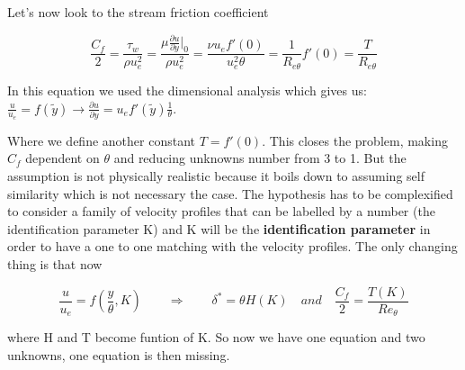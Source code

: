 Let's now look to the stream friction coefficient

\begin{equation}
\frac{C_f}{2}=\frac{\tau_w}{\rho u_e^2}=\frac{\mu \frac{\partial u}{\partial y}|_0}{\rho u_e^2}=\frac{\nu u_e f'(0)}{u_e^2 \theta}=\frac{1}{R_{e \theta}} f'(0)=\frac{T}{R_{e \theta}}
\end{equation}

In this equation we used the dimensional analysis which gives us:
$\frac{u}{u_e}=f(\tilde{y}) \rightarrow \frac{\partial u}{\partial y}=u_e f'(\tilde{y}) \frac{1}{\theta}$.

Where we define another constant $T=f'(0)$. This closes the problem, making $C_f$ dependent on $\theta$ and reducing unknowns number from 3 to 1. But the assumption is not physically realistic because it boils down to assuming self similarity which is not necessary the case. The hypothesis has to be complexified to consider a family of velocity profiles that can be labelled by a number (the identification parameter K) and K will be the \textbf{identification parameter} in order to have a one to one matching with the velocity profiles. The only changing thing is that now 

\begin{equation}
\frac{u}{u_e} = f(\frac{y}{\theta}, K) \qquad \Rightarrow \qquad \delta^*=\theta H(K) \quad and \quad \frac{C_f}{2} = \frac{T(K)}{Re_\theta}
\label{eq:5.86}
\end{equation}

where H and T become funtion of K. So now we have one equation and two unknowns, one equation is then missing.
\\

